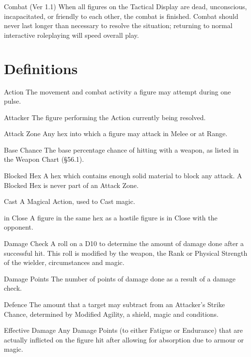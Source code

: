 \begin{Chapter}{Combat (Ver 1.1)}
When all figures on the Tactical Display are dead, unconscious,
incapacitated, or friendly to each other, the combat is finished.
Combat should never last longer than necessary to resolve the
situation; returning to normal interactive roleplaying will speed
overall play.

\section{Definitions}

\begin{Description}
\item[Action] The movement and combat activity a figure may attempt
  during one pulse.

\item[Attacker] The figure performing the Action currently being
  resolved.

\item[Attack] Zone Any hex into which a figure may attack in Melee or
  at Range.

\item[Base Chance] The base percentage chance of hitting with a
  weapon, as listed in the Weapon Chart (§56.1).

\item[Blocked Hex] A hex which contains enough solid material to block
  any attack.  A Blocked Hex is never part of an Attack Zone.

\item[Cast] A Magical Action, used to Cast magic.

\item[in Close] A figure in the same hex as a hostile figure is in
  Close with the opponent.

\item[Damage Check] A roll on a D10 to determine the amount of damage
  done after a successful hit. This roll is modified by the weapon,
  the Rank or Physical Strength of the wielder, circumstances and
  magic.

\item[Damage Points] The number of points of damage done as a result
  of a damage check.

\item[Defence] The amount that a target may subtract from an
  Attacker’s Strike Chance, determined by Modified Agility, a shield,
  magic and conditions.

\item[Effective Damage] Any Damage Points (to either Fatigue or
  Endurance) that are actually inflicted on the figure hit after
  allowing for absorption due to armour or magic.


\end{Description}
\end{Chapter}
